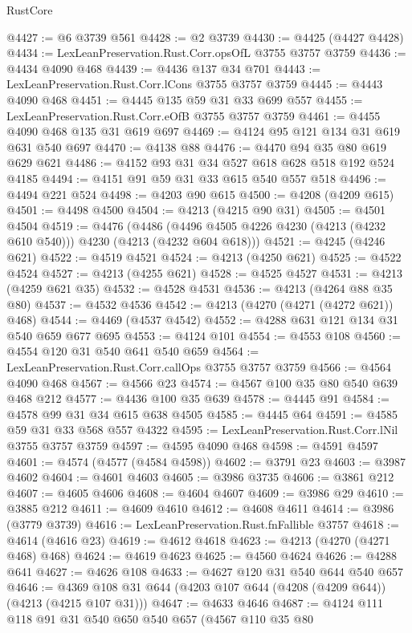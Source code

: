 \begin{lexlean}{RustCore}
\begin{coremodule}
@4427 := @6 @3739 @561
@4428 := @2 @3739
@4430 := @4425 (@4427 @4428)
@4434 := LexLeanPreservation.Rust.Corr.opsOfL @3755 @3757 @3759
@4436 := @4434 @4090 @468
@4439 := @4436 @137 @34 @701
@4443 := LexLeanPreservation.Rust.Corr.lCons @3755 @3757 @3759
@4445 := @4443 @4090 @468
@4451 := @4445 @135 @59 @31 @33 @699 @557
@4455 := LexLeanPreservation.Rust.Corr.eOfB @3755 @3757 @3759
@4461 := @4455 @4090 @468 @135 @31 @619 @697
@4469 := @4124 @95 @121 @134 @31 @619 @631 @540 @697
@4470 := @4138 @88
@4476 := @4470 @94 @35 @80 @619 @629 @621
@4486 := @4152 @93 @31 @34 @527 @618 @628 @518 @192 @524 @4185
@4494 := @4151 @91 @59 @31 @33 @615 @540 @557 @518
@4496 := @4494 @221 @524
@4498 := @4203 @90 @615
@4500 := @4208 (@4209 @615)
@4501 := @4498 @4500
@4504 := @4213 (@4215 @90 @31)
@4505 := @4501 @4504
@4519 := @4476
    (@4486 (@4496 @4505 @4226 @4230 (@4213 (@4232 @610 @540))) @4230 (@4213 (@4232 @604 @618)))
@4521 := @4245 (@4246 @621)
@4522 := @4519 @4521
@4524 := @4213 (@4250 @621)
@4525 := @4522 @4524
@4527 := @4213 (@4255 @621)
@4528 := @4525 @4527
@4531 := @4213 (@4259 @621 @35)
@4532 := @4528 @4531
@4536 := @4213 (@4264 @88 @35 @80)
@4537 := @4532 @4536
@4542 := @4213 (@4270 (@4271 (@4272 @621)) @468)
@4544 := @4469 (@4537 @4542)
@4552 := @4288 @631 @121 @134 @31 @540 @659 @677 @695
@4553 := @4124 @101
@4554 := @4553 @108
@4560 := @4554 @120 @31 @540 @641 @540 @659
@4564 := LexLeanPreservation.Rust.Corr.callOps @3755 @3757 @3759
@4566 := @4564 @4090 @468
@4567 := @4566 @23
@4574 := @4567 @100 @35 @80 @540 @639 @468 @212
@4577 := @4436 @100 @35 @639
@4578 := @4445 @91
@4584 := @4578 @99 @31 @34 @615 @638 @4505
@4585 := @4445 @64
@4591 := @4585 @59 @31 @33 @568 @557 @4322
@4595 := LexLeanPreservation.Rust.Corr.lNil @3755 @3757 @3759
@4597 := @4595 @4090 @468
@4598 := @4591 @4597
@4601 := @4574 (@4577 (@4584 @4598))
@4602 := @3791 @23
@4603 := @3987 @4602
@4604 := @4601 @4603
@4605 := @3986 @3735
@4606 := @3861 @212
@4607 := @4605 @4606
@4608 := @4604 @4607
@4609 := @3986 @29
@4610 := @3885 @212
@4611 := @4609 @4610
@4612 := @4608 @4611
@4614 := @3986 (@3779 @3739)
@4616 := LexLeanPreservation.Rust.fnFallible @3757
@4618 := @4614 (@4616 @23)
@4619 := @4612 @4618
@4623 := @4213 (@4270 (@4271 @468) @468)
@4624 := @4619 @4623
@4625 := @4560 @4624
@4626 := @4288 @641
@4627 := @4626 @108
@4633 := @4627 @120 @31 @540 @644 @540 @657
@4646 := @4369 @108 @31 @644 (@4203 @107 @644 (@4208 (@4209 @644)) (@4213 (@4215 @107 @31)))
@4647 := @4633 @4646
@4687 := @4124
    @111
    @118
    @91
    @31
    @540
    @650
    @540
    @657
    (@4567
      @110
      @35
      @80

\end{coremodule}
\end{lexlean}
